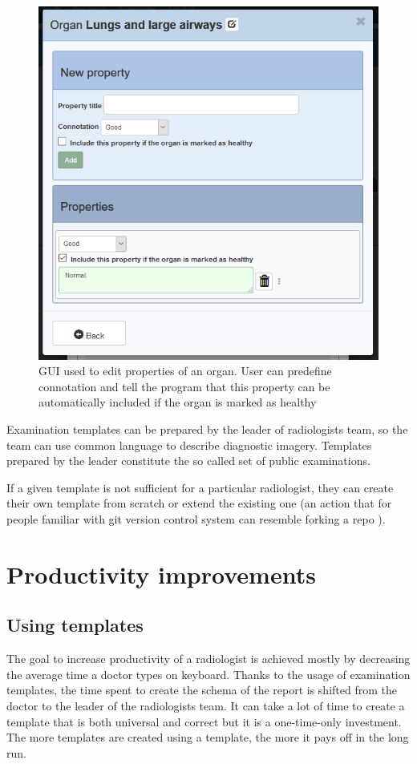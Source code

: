 \documentclass[12pt, twoside, openany]{report}
\theoremstyle{definition}
\begin{document}
\begin{figure}
    \centering
    \includegraphics{template-property-list}
    \caption{GUI used to edit properties of an organ. User can predefine connotation and tell the program that this property can be automatically included if the organ is marked as healthy \label{fig:template-property-list}}
\end{figure}

Examination templates can be prepared by the leader of radiologists team, so the team can use common language to describe diagnostic imagery. Templates prepared by the leader constitute the so called set of public examinations.

If a given template is not sufficient for a particular radiologist, they can create their own template from scratch or extend the existing one (an action that for people familiar with git version control system can resemble forking a repo \cite{forking}).


\section{Productivity improvements}
\subsection{Using templates}
The goal to increase productivity of a radiologist is achieved mostly by decreasing the average time a doctor types on keyboard. Thanks to the usage of examination templates, the time spent to create the schema of the report is shifted from the doctor to the leader of the radiologists team. It can take a lot of time to create a template that is both universal and correct but it is a one-time-only investment. The more templates are created using a template, the more it pays off in the long run.
\end{document}
